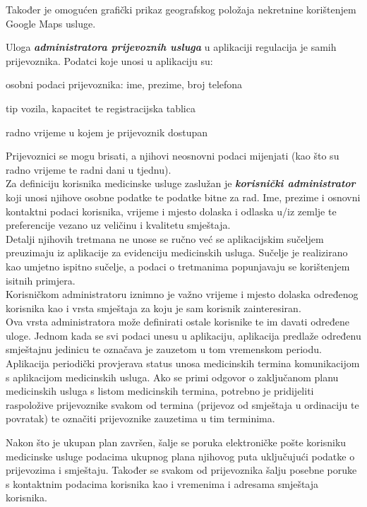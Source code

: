 		
		{Također je omogućen grafički prikaz geografskog položaja nekretnine korištenjem Google Maps usluge.}
		
		{Uloga \textbf{\textit{administratora prijevoznih usluga}} u aplikaciji regulacija je samih prijevoznika. Podatci koje unosi u aplikaciju su:}
		\begin{packed_item}
			\item {osobni podaci prijevoznika: ime, prezime, broj telefona}
			\item {tip vozila, kapacitet te registracijska tablica}
			\item {radno vrijeme u kojem je prijevoznik dostupan}
		\end{packed_item}
		{Prijevoznici se mogu brisati, a njihovi neosnovni podaci mijenjati (kao što su radno vrijeme te radni dani u tjednu).}\\
		
		
		{Za definiciju korisnika medicinske usluge zaslužan je \textbf{\textit{korisnički administrator}} koji  unosi njihove osobne podatke te podatke bitne za rad. Ime, prezime i osnovni kontaktni podaci korisnika, vrijeme i mjesto dolaska i odlaska u/iz zemlje te preferencije vezano uz veličinu i kvalitetu smještaja. \\Detalji njihovih tretmana ne unose se ručno već se aplikacijskim sučeljem preuzimaju iz aplikacije za evidenciju medicinskih usluga. Sučelje je realizirano kao umjetno ispitno sučelje, a podaci o tretmanima popunjavaju se korištenjem isitnih primjera. \\Korisničkom administratoru iznimno je važno vrijeme i mjesto dolaska određenog korisnika kao i vrsta smještaja za koju je sam korisnik zainteresiran.\\Ova vrsta administratora može definirati ostale korisnike te im davati određene uloge.}
		{Jednom kada se svi podaci unesu u aplikaciju, aplikacija predlaže određenu smještajnu jedinicu te označava je zauzetom u tom vremenskom periodu.}\\
		
		{Aplikacija periodički provjerava status unosa medicinskih termina komunikacijom s aplikacijom medicinskih usluga. Ako se primi odgovor o zaključanom planu medicinskih usluga s listom medicinskih termina, potrebno je  pridijeliti raspoložive prijevoznike svakom od termina (prijevoz od smještaja u ordinaciju te povratak) te označiti prijevoznike zauzetima u tim terminima. }
		
		{Nakon što je ukupan plan završen, šalje se poruka elektroničke pošte korisniku medicinske usluge podacima ukupnog plana njihovog puta uključujući podatke o prijevozima i smještaju. Također se svakom od prijevoznika šalju posebne poruke s kontaktnim podacima korisnika kao i vremenima i adresama smještaja korisnika.}\\
		

